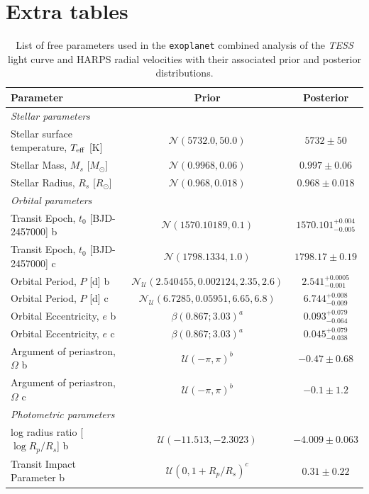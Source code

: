 \documentclass[fleqn,usenatbib]{mnras}
\newcommand{\tess}{{\it TESS}}
\newcommand{\harps}{{HARPS}}
\newcommand{\teff}{$T_{\rm eff}$}
\newcommand{\TTeff}{ $ 5732 \pm 50 $ }
\newcommand{\Tmstar}{ $ 0.997 \pm 0.06 $ }
\newcommand{\Trstar}{ $ 0.968 \pm 0.018 $ }
\newcommand{\Ttzerozero}{ $ 1570.101^{+0.004}_{-0.005} $ }
\newcommand{\Ttzeroone}{ $ 1798.17 \pm 0.19 $ }
\newcommand{\TPzero}{ $ 2.541^{+0.0005}_{-0.001} $ }
\newcommand{\TPone}{ $ 6.744^{+0.008}_{-0.009} $ }
\newcommand{\Tecczero}{ $ 0.093^{+0.079}_{-0.064} $ }
\newcommand{\Teccone}{ $ 0.045^{+0.079}_{-0.038} $ }
\newcommand{\Tomegazero}{ $ -0.47 \pm 0.68 $ }
\newcommand{\Tomegaone}{ $ -0.1 \pm 1.2 $ }
\newcommand{\Tlogror}{ $ -4.009 \pm 0.063 $ }
\newcommand{\Tb}{ $ 0.31 \pm 0.22 $ }
\begin{document}
\section{Extra tables}

\centering
\begin{table}
\caption{List of free parameters used in the \texttt{exoplanet} combined analysis of the \tess{} light curve and \harps{} radial velocities with their associated prior and posterior distributions.}
\label{tab:planetparlong}
\begin{center}
\begin{tabular}{lcc}
\hline
\hline
Parameter & Prior & Posterior\\
\hline
\hline
\multicolumn{3}{l}{\it Stellar parameters}\\
Stellar surface temperature, \teff{} [K] &  $\mathcal{N}(5732.0,50.0)$  & \TTeff{} \\
Stellar Mass, $M_s$ [$M_{\odot}$] &  $\mathcal{N}(0.9968,0.06)$  & \Tmstar{} \\
Stellar Radius, $R_s$ [$R_{\odot}$] &  $\mathcal{N}(0.968,0.018)$  & \Trstar{} \\
\hline
\multicolumn{3}{l}{\it Orbital parameters}\\
Transit Epoch, $t_0$ [BJD-2457000] b &  $\mathcal{N}(1570.10189,0.1)$  &  \Ttzerozero{} \\
Transit Epoch, $t_0$ [BJD-2457000] c &  $\mathcal{N}(1798.1334,1.0)$  & \Ttzeroone{} \\
Orbital Period, $P$ [d] b &  $\mathcal{N}_{\mathcal{U}}(2.540455,0.002124,2.35,2.6)$  & \TPzero{} \\
Orbital Period, $P$ [d] c &  $\mathcal{N}_{\mathcal{U}}(6.7285,0.05951,6.65,6.8)$  & \TPone{} \\
Orbital Eccentricity, $e$ b &  $\beta(0.867;3.03)^{a}$  & \Tecczero{} \\
Orbital Eccentricity, $e$ c &  $\beta(0.867;3.03)^{a}$  & \Teccone{} \\
Argument of periastron, $\Omega$ b &  $\mathcal{U}(-\pi,\pi)^{b}$  &  \Tomegazero{} \\
Argument of periastron, $\Omega$ c &  $\mathcal{U}(-\pi,\pi)^{b}$  & \Tomegaone{} \\
\hline
\multicolumn{3}{l}{\it Photometric parameters}\\
log radius ratio [$\log{R_p/R_s}$] b &  $\mathcal{U}(-11.513,-2.3023)$  & \Tlogror{} \\
Transit Impact Parameter b & $\mathcal{U}(0,1+R_p/R_s)^{c}$  & \Tb{} \\

\end{tabular}
\end{center}
\end{table}
\end{document}
